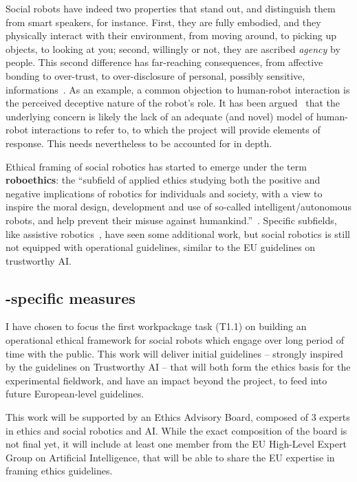 \begin{rewrite}
Social robots have indeed two properties that stand out, and distinguish them
from smart speakers, for instance.  First, they are fully embodied, and they
physically interact with their environment, from moving around, to picking up
objects, to looking at you; second, willingly or not, they are ascribed
\emph{agency} by people. This second difference has far-reaching consequences,
from affective bonding to over-trust, to over-disclosure of personal, possibly
sensitive, informations~\cite{martelaro2016tell,shiomi2017robot}.  As an
example, a common objection to human-robot interaction is the perceived
deceptive nature of the robot's role. It has been
argued~\cite{biscontilucidi2018companion} that the underlying concern is likely
the lack of an adequate (and novel) model of human-robot interactions to refer
to, to which the project will provide elements of response. This needs
nevertheless to be accounted for in depth.

Ethical framing of social robotics has started to
emerge under the term \textbf{roboethics}: the ``subfield of applied ethics
studying both the positive and negative implications of robotics for individuals
and society, with a view to inspire the moral design, development and use of
so-called intelligent/autonomous robots, and help prevent their misuse against
humankind.''~\cite{allen2011robot}. Specific subfields, like assistive
robotics~\cite{sharkey2012granny}, have seen some additional work, but social
robotics is still not equipped with operational guidelines, similar to the EU
guidelines on trustworthy AI.

\subsection{\project-specific measures}

I have chosen to focus the first workpackage task (T1.1) on building an
operational ethical framework for social robots which engage over long period of
time with the public. This work will deliver initial guidelines -- strongly
inspired by the guidelines on Trustworthy AI -- that will both form the ethics
basis for the \project experimental fieldwork, and have an impact beyond the
project, to feed into future European-level guidelines.

This work will be supported by an Ethics Advisory Board, composed of 3 experts
in ethics and social robotics and AI. While the exact composition of the board
is not final yet, it will include at least one member from the EU High-Level
Expert Group on Artificial Intelligence, that will be able to share the EU
expertise in framing ethics guidelines.


\end{rewrite}
